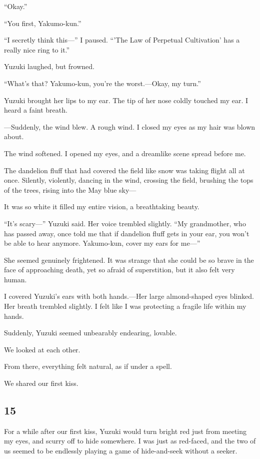 \documentclass[
    a4paper,
    12pt,
    twoside,
    openany,
    UTF8,
    fontset=windows
]{ctexbook}
\begin{document}
``Okay.''

``You first, Yakumo-kun.''

``I secretly think this---'' I paused. ``'The Law of Perpetual Cultivation' has a really nice ring to it.''

Yuzuki laughed, but frowned.

``What's that? Yakumo-kun, you're the worst.---Okay, my turn.''

Yuzuki brought her lips to my ear. The tip of her nose coldly touched my ear. I heard a faint breath.

---Suddenly, the wind blew. A rough wind. I closed my eyes as my hair was blown about.

The wind softened. I opened my eyes, and a dreamlike scene spread before me.

The dandelion fluff that had covered the field like snow was taking flight all at once. Silently, violently, dancing in the wind, crossing the field, brushing the tops of the trees, rising into the May blue sky---

It was so white it filled my entire vision, a breathtaking beauty.

``It's scary---'' Yuzuki said. Her voice trembled slightly. ``My grandmother, who has passed away, once told me that if dandelion fluff gets in your ear, you won't be able to hear anymore. Yakumo-kun, cover my ears for me---''

She seemed genuinely frightened. It was strange that she could be so brave in the face of approaching death, yet so afraid of superstition, but it also felt very human.

I covered Yuzuki's ears with both hands.---Her large almond-shaped eyes blinked. Her breath trembled slightly. I felt like I was protecting a fragile life within my hands.

Suddenly, Yuzuki seemed unbearably endearing, lovable.

We looked at each other.

From there, everything felt natural, as if under a spell.

We shared our first kiss.


\subsection*{15}

For a while after our first kiss, Yuzuki would turn bright red just from meeting my eyes, and scurry off to hide somewhere. I was just as red-faced, and the two of us seemed to be endlessly playing a game of hide-and-seek without a seeker.
\end{document}
